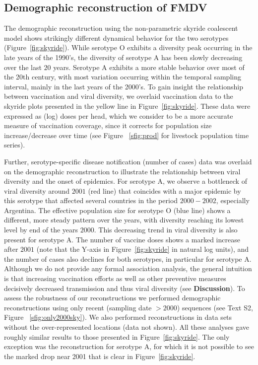 \documentclass[10pt]{article}
\begin{document}
\subsection*{Demographic reconstruction of FMDV}

The demographic reconstruction using the non-parametric skyride coalescent model shows strikingly different dynamical behavior for the two serotypes (Figure~\ref{fig:skyride}).
While serotype O exhibits a diversity peak occurring in the late years of the 1990's, the diversity of serotype A has been slowly decreasing over the last $20$ years.
Serotype A exhibits a more stable behavior over most of the 20th century, with most variation occurring within the temporal sampling interval, mainly in the last years of the 2000's.
To gain insight the relationship between vaccination and viral diversity, we overlaid vaccination data to the skyride plots presented in the yellow line in Figure~\ref{fig:skyride}.
These data were expressed as (log) doses per head, which we consider to be a more accurate measure of vaccination coverage, since it corrects for population size increase/decrease over time (see Figure ~\ref{sfig:prod} for livestock population time series). 

Further, serotype-specific disease notification (number of cases) data was overlaid on the demographic reconstruction to illustrate the relationship between viral diversity and the onset of epidemics. 
For serotype A, we observe a bottleneck of viral diversity around $2001$ (red line) that coincides with a major epidemic by this serotype that affected several countries in the period $2000-2002$, especially Argentina.
The effective population size for serotype O (blue line) shows a different, more steady pattern over the years, with diversity reaching its lowest level by end of the years $2000$.
This decreasing trend in viral diversity is also present for serotype A.
The number of vaccine doses shows a marked increase after $2001$ (note that the Y-axis in Figure~\ref{fig:skyride} in natural log units), and the number of cases also declines for both serotypes, in particular for serotype A.
Although we do not provide any formal association analysis, the general intuition is that increasing vaccination efforts as well as other preventive measures decisively decreased transmission and thus viral diversity (see \textbf{Discussion}).
To assess the robustness of our reconstructions we performed demographic reconstructions using only recent (sampling date $>2000$) sequences (see Text S2, Figure ~\ref{sfig:only2000sky}).
We also performed reconstructions in data sets without the over-represented locations (data not shown).
All these analyses gave roughly similar results to those presented in Figure~\ref{fig:skyride}.
The only exception was the reconstruction for serotype A, for which it is not possible to see the marked drop near 2001 that is clear in Figure~\ref{fig:skyride}. 
\end{document}
